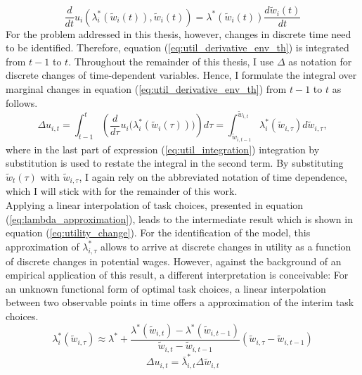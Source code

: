 \documentclass[../main.tex]{subfiles}
\begin{document}
\begin{equation} \label{eq:util_derivative_env_th}
	\frac{d }{dt} u_{i}(\lambda_i^*(\tilde{w}_i(t)), \tilde{w}_i(t)) = \lambda^*(\tilde{w}_i(t)) \frac{d \tilde{w}_i (t)}{d t}
\end{equation}
For the problem addressed in this thesis, however, changes in discrete time need to be identified. Therefore, equation (\ref{eq:util_derivative_env_th}) is integrated from $t-1$ to $t$. Throughout the remainder of this thesis, I use $\Delta$ as notation for discrete changes of time-dependent variables. Hence, I formulate the integral over marginal changes in equation (\ref{eq:util_derivative_env_th}) from $t-1$ to $t$ as follows. 
\begin{equation} \label{eq:util_integration}
	\Delta u_{i,t} = \int^t_{t-1} \left( \frac{d}{d \tau} u_i\big(\lambda_i^*(\tilde{w}_i(\tau))\big) \right) d\tau = \int^{\tilde{w}_{i,t}}_{\tilde{w}_{i,t-1}} \lambda_i^*(\tilde{w}_{i, \tau}) d\tilde{w}_{i, \tau}, 
\end{equation}
where in the last part of expression (\ref{eq:util_integration}) integration by substitution is used to restate the integral in the second term. By substituting $\tilde{w}_t(\tau)$ with $\tilde{w}_{i,\tau}$, I again rely on the abbreviated notation of time dependence, which I will stick with for the remainder of this work. 
\\
Applying a linear interpolation of task choices, presented in equation (\ref{eq:lambda_approximation}), leads to the intermediate result which is shown in equation (\ref{eq:utility_change}). For the identification of the model, this approximation of $\lambda_{i,\tau}^*$ allows to arrive at discrete changes in utility as a function of discrete changes in potential wages. However, against the background of an empirical application of this result, a different interpretation is conceivable: For an unknown functional form of optimal task choices, a linear interpolation between two observable points in time offers a approximation of the interim task choices.
\begin{equation} \label{eq:lambda_approximation}
	\lambda^*_i(\tilde{w}_{i,\tau}) \approx \lambda^* + \frac{\lambda^*(\tilde{w}_{i,t}) - \lambda^*(\tilde{w}_{i,t-1})}{\tilde{w}_{i,t} - \tilde{w}_{i,t-1}} (\tilde{w}_{i,\tau} - \tilde{w}_{i,t-1})
\end{equation}
\begin{equation} \label{eq:utility_change}
	\Delta u_{i,t} = \bar{\lambda}_{i,t}^* \Delta \tilde{w}_{i,t}
\end{equation}
\end{document}
